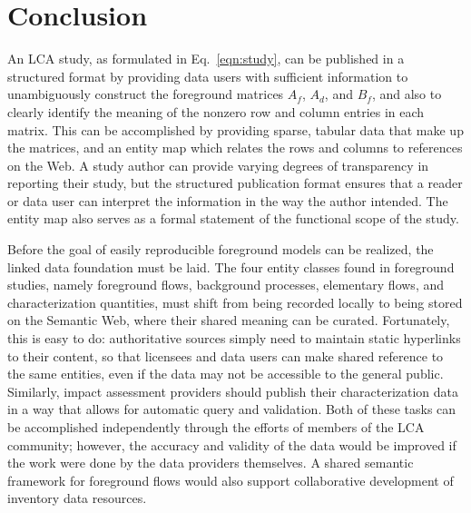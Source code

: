 \section{Conclusion}

An LCA study, as formulated in Eq.~\ref{eqn:study}, can be published in a structured format by providing data users with sufficient information to unambiguously construct the foreground matrices $A_f$, $A_d$, and $B_f$, and also to clearly identify the meaning of the nonzero row and column entries in each matrix.  This can be accomplished by providing sparse, tabular data that make up the matrices, and an entity map which relates the rows and columns to references on the Web.  A study author can provide varying degrees of transparency in reporting their study, but the structured publication format ensures that a reader or data user can interpret the information in the way the author intended.  The entity map also serves as a formal statement of the functional scope of the study.

Before the goal of easily reproducible foreground models can be realized, the linked data foundation must be laid.   The four entity classes found in foreground studies, namely foreground flows, background processes, elementary flows, and characterization quantities, must shift from being recorded locally to being stored on the Semantic Web, where their shared meaning can be curated.  Fortunately, this is easy to do: authoritative sources simply need to maintain static hyperlinks to their content, so that licensees and data users can make shared reference to the same entities, even if the data may not be accessible to the general public. %
Similarly, impact assessment providers should publish their characterization data in a way that allows for automatic query and validation.  Both of these tasks can be accomplished independently through the efforts of members of the LCA community; however, the accuracy and validity of the data would be improved if the work were done by the data providers themselves.  A shared semantic framework for foreground flows would also support collaborative development of inventory data resources.

